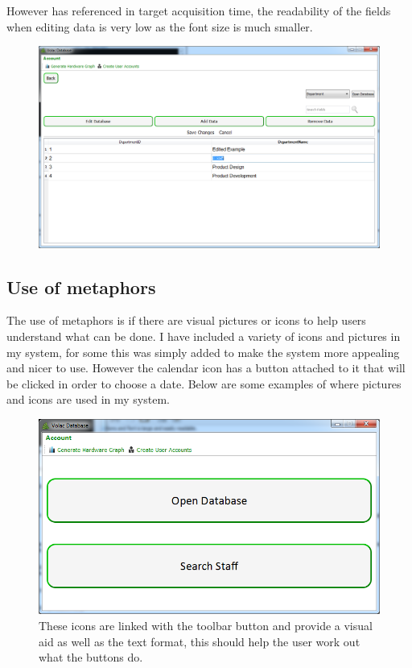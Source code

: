 However has referenced in target acquisition time, the readability of the fields when editing data is very low as the font size is much smaller.

\begin{figure}[H]
    \includegraphics[width=\textwidth]{./Evaluation/Images/admin2.png}
\end{figure}

\subsection{Use of metaphors}

The use of metaphors is if there are visual pictures or icons to help users understand what can be done. I have included a variety of icons and pictures in my system, for some this was simply added to make the system more appealing and nicer to use. However the calendar icon has a button attached to it that will be clicked in order to choose a date. Below are some examples of where pictures and icons are used in my system.

\begin{figure}[H]
    \includegraphics[width=\textwidth]{./Evaluation/Images/toolbaricons.png}
    \caption{These icons are linked with the toolbar button and provide a visual aid as well as the text format, this should help the user work out what the buttons do.} 
\end{figure}

